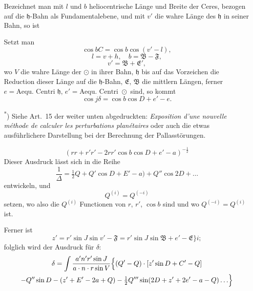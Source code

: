 \documentclass[12pt,a4paper]{article}
\newcommand{\Ceres}{\odot}
\newcommand{\Jupiter}{\mathfrak{h}}
\begin{document}
Bezeichnet man mit $l$ und $b$ heliocentrische Länge und Breite der Ceres, bezogen auf die $\Jupiter$-Bahn als Fundamentalebene, und mit $v'$ die wahre Länge des $\Jupiter$ in seiner Bahn, so ist

Setzt man
\[\cos bC = \cos b \cos(v' - l),\]
\[l = v + h, \quad b = \mathfrak{B} - \mathfrak{F},\]
\[v' = \mathfrak{B} + \mathfrak{E}',\]
wo $V$ die wahre Länge der $\Ceres$ in ihrer Bahn, $\mathfrak{h}$ bis auf das Vorzeichen die Reduction dieser Länge auf die $\Jupiter$-Bahn, $\mathfrak{E}$, $\mathfrak{B}$ die mittlern Längen, ferner $e = \text{Aequ.~Centri } \Jupiter$, $e' = \text{Aequ.~Centri } \Ceres$ sind, so kommt
\[\cos j \delta = \cos b \cos D + e' - e.\]

\smallskip\noindent\textsuperscript{*}) Siehe Art.~15 der weiter unten abgedruckten: \textit{Exposition d'une nouvelle méthode de calculer les perturbations planétaires} oder auch die etwas ausführlichere Darstellung bei der Berechnung der Pallasstörungen.\text{]}

\newpage
\setcounter{page}{413}
%
\begin{equation}
(rr + r'r' - 2rr'\cos b \cos D + e' - a)^{-\frac{1}{2}}
\end{equation}
Dieser Ausdruck lässt sich in die Reihe
\[\frac{1}{\Delta} = \tfrac{1}{2}Q + Q' \cos D + E' - a) + Q'' \cos 2D + \ldots\]
entwickeln, und
\[Q^{(i)} = Q^{(-i)}\]
setzen, wo also die $Q^{(i)}$ Functionen von $r$, $r'$, $\cos b$ sind und wo $Q^{(-i)} = Q^{(i)}$ ist.

Ferner ist
\[z' = r' \sin J \sin v' - \mathfrak{F} = r' \sin J \sin \mathfrak{B} + e' - \mathfrak{E}\}i;\]
folglich wird der Ausdruck für $\delta$:
\begin{multline}
\delta = \int \frac{a' n' r' \sin J}{a \cdot n \cdot r \sin V} \Bigl\{(Q' - Q) \cdot [z' \sin D + C' - Q]\\
- Q'' \sin D - (z' + E' - 2a + Q) - \tfrac{1}{2} Q''' \sin(2D + z' + 2e' - a - Q) \ldots\Bigr\}
\end{multline}
\end{document}
